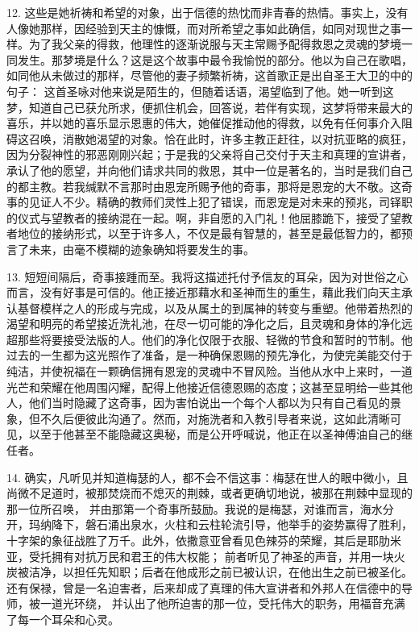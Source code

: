 12. 这些是她祈祷和希望的对象，出于信德的热忱而非青春的热情。事实上，没有人像她那样，因经验到天主的慷慨，而对所希望之事如此确信，如同对现世之事一样。为了我父亲的得救，他理性的逐渐说服与天主常赐予配得救恩之灵魂的梦境一同发生。那梦境是什么？这是这个故事中最令我愉悦的部分。他以为自己在歌唱，如同他从未做过的那样，尽管他的妻子频繁祈祷，这首歌正是出自圣王大卫的中的句子： 这首圣咏对他来说是陌生的，但随着话语，渴望临到了他。她一听到这梦，知道自己已获允所求，便抓住机会，回答说，若伴有实现，这梦将带来最大的喜乐，并以她的喜乐显示恩惠的伟大，她催促推动他的得救，以免有任何事介入阻碍这召唤，消散她渴望的对象。恰在此时，许多主教正赶往，以对抗亚略的疯狂，因为分裂神性的邪恶刚刚兴起；于是我的父亲将自己交付于天主和真理的宣讲者，承认了他的愿望，并向他们请求共同的救恩，其中一位是著名的，当时是我们自己的都主教。若我缄默不言那时由恩宠所赐予他的奇事，那将是恩宠的大不敬。这奇事的见证人不少。精确的教师们灵性上犯了错误，而恩宠是对未来的预兆，司铎职的仪式与望教者的接纳混在一起。啊，非自愿的入门礼！他屈膝跪下，接受了望教者地位的接纳形式，以至于许多人，不仅是最有智慧的，甚至是最低智力的，都预言了未来，由毫不模糊的迹象确知将要发生的事。\par

13. 短短间隔后，奇事接踵而至。我将这描述托付予信友的耳朵，因为对世俗之心而言，没有好事是可信的。他正接近那藉水和圣神而生的重生，藉此我们向天主承认基督模样之人的形成与完成，以及从属土的到属神的转变与重塑。他带着热烈的渴望和明亮的希望接近洗礼池，在尽一切可能的净化之后，且灵魂和身体的净化远超那些将要接受法版的人。他们的净化仅限于衣服、轻微的节食和暂时的节制。他过去的一生都为这光照作了准备，是一种确保恩赐的预先净化，为使完美能交付于纯洁，并使祝福在一颗确信拥有恩宠的灵魂中不冒风险。当他从水中上来时，一道光芒和荣耀在他周围闪耀，配得上他接近信德恩赐的态度；这甚至显明给一些其他人，他们当时隐藏了这奇事，因为害怕说出一个每个人都以为只有自己看见的景象，但不久后便彼此沟通了。然而，对施洗者和入教引导者来说，这如此清晰可见，以至于他甚至不能隐藏这奥秘，而是公开呼喊说，他正在以圣神傅油自己的继任者。\par

14. 确实，凡听见并知道梅瑟的人，都不会不信这事：梅瑟在世人的眼中微小，且尚微不足道时，被那焚烧而不熄灭的荆棘，或者更确切地说，被那在荆棘中显现的那一位所召唤，\newline{} 并由那第一个奇事所鼓励。我说的是梅瑟，对谁而言，海水分开，玛纳降下，磐石涌出泉水，火柱和云柱轮流引导，他举手的姿势赢得了胜利，十字架的象征战胜了万千。\newline{}此外，依撒意亚曾看见色辣芬的荣耀，其后是耶肋米亚，受托拥有对抗万民和君王的伟大权能；\newline{} 前者听见了神圣的声音，并用一块火炭被洁净，以担任先知职；后者在他成形之前已被认识，在他出生之前已被圣化。\newline{}还有保禄，曾是一名迫害者，后来却成了真理的伟大宣讲者和外邦人在信德中的导师，被一道光环绕，\newline{} 并认出了他所迫害的那一位，受托伟大的职务，用福音充满了每一个耳朵和心灵。\par

